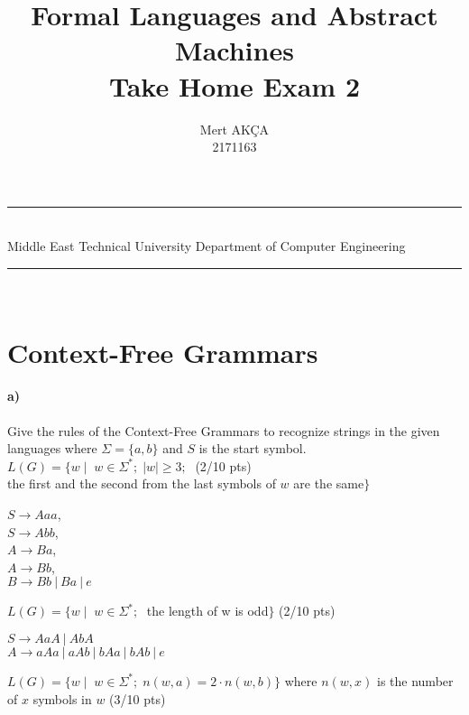 \documentclass[a4paper,12pt]{article}
\title{Formal Languages and Abstract Machines \\ Take Home Exam 2}
\author{Mert AKÇA \\ 2171163 } %
\date{} %
\newcommand{\HRule}{\rule{\linewidth}{1mm}}
\begin{document}
\HRule\\
Middle East Technical University \hfill Department of Computer Engineering
{\let\newpage\relax\maketitle}
\HRule\\
\vspace{1cm}


\section{Context-Free Grammars \hfill {}}

\paragraph{a)} Give the rules of the Context-Free Grammars to recognize strings in the given languages where $\Sigma=\{a,b\}$ and $S$ is the start symbol. \\  

$L(G)=\{w \mid \;  w \in \Sigma^*;\; |w| \geq 3;\; $  \hfill \small{(2/10 pts)} \\
\hspace*{22mm} the first and the second from the last symbols of $w$ are the same$\}$ \\

\begin{tcolorbox}
$S \to Aaa$, \\
$S \to Abb$, \\
$A \to Ba$, \\
$A \to Bb$, \\
$B \to Bb\ |\ Ba\ |\ e$ \\
\end{tcolorbox}


$L(G)=\{w \mid \;  w \in \Sigma^*;\; $ the length of w is odd$\}$ \hfill \small{(2/10 pts)} \\

\begin{tcolorbox}
$S \to AaA\ |\ AbA$ \\
$A \to aAa \ |\ aAb \ |\ bAa \ | \ bAb \ |\ e$ \\
\end{tcolorbox}


$L(G)=\{w \mid \;  w \in \Sigma^*;\; n(w,a)=2\cdot n(w,b)\}$ where $n(w,x)$ is the number of $x$ symbols in $w$ \hfill \small{(3/10 pts)} \\
\end{document}
